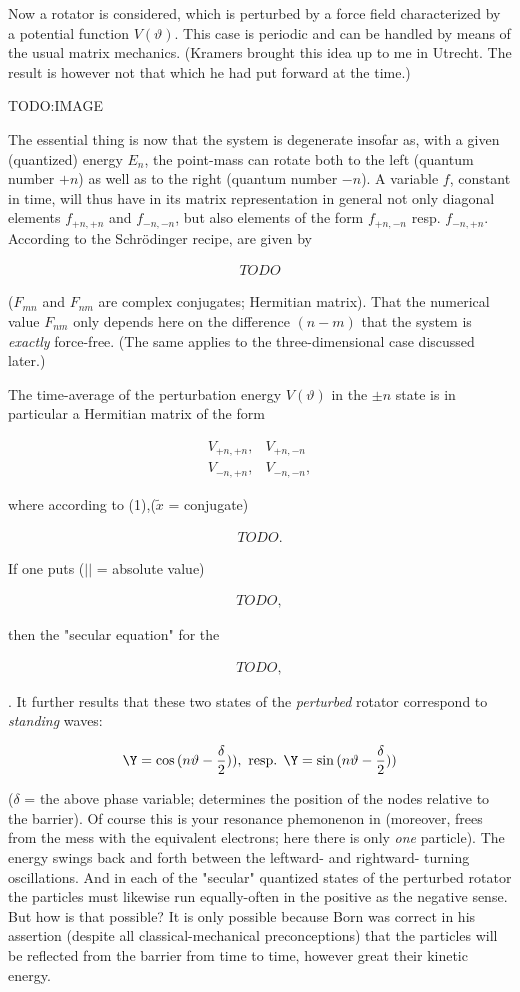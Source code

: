 \documentclass{article}
\newcommand{\nequ}[2]{
\begin{align*}
#1
\tag{#2}
\end{align*}
}
\newcommand{\uequ}[1]{
\begin{align*}
#1
\end{align*}
}
\begin{document}
Now a rotator is considered, which is perturbed  by a force field characterized by a potential function $V(\vartheta)$. This case is periodic and can be handled by means of the usual matrix mechanics.  (Kramers brought this idea up to me in Utrecht. The result is however not that which he had put forward at the time.)


TODO:IMAGE

The essential thing is now that the system is degenerate insofar as, with a given (quantized) energy $E_n$, the point-mass can rotate both to the left (quantum number $+n$) as well as to the right (quantum number $-n$). A variable $f$, constant in time, will thus have in its matrix representation in general not only diagonal elements $f_{+n,+n}$ and $f_{-n,-n}$, but also elements of the form $f_{+n,-n}$ resp. $f_{-n,+n}$. According to the Schr\"odinger recipe,  are given by
\nequ{
TODO
}{1}
($F_{mn}$ and $F_{nm}$ are complex conjugates; Hermitian matrix). That the numerical value $F_{nm}$ only depends here on the difference $(n-m)$  that the system is \textit{exactly} force-free. (The same applies to the three-dimensional case discussed later.)

The time-average of the perturbation energy $V(\vartheta)$ in the $\pm n$ state is in particular a Hermitian matrix of the form
\uequ{
V_{+n,+n}, & V_{+n, -n}\\
V_{-n,+n}, & V_{-n, -n},
}
where according to (1),($\widetilde{x}$ = conjugate)
\uequ{
TODO.
}
If one puts ($||$ = absolute value)
\uequ{
TODO,
}
then the "secular equation" for the 
\uequ{
TODO,
}
. It further results that these two states of the \textit{perturbed} rotator correspond to \textit{standing} waves:
\uequ{
\Y = \cos{(n\vartheta - \frac{\delta}{2}))},\text{ resp. }
\Y = \sin{(n\vartheta - \frac{\delta}{2}))}
}
($\delta$ = the above phase variable; determines the position of the nodes relative to the barrier). Of course this is your  resonance phemonenon in  (moreover, frees from the mess with the equivalent electrons; here there is only \textit{one} particle). The energy swings back and forth between the leftward- and rightward- turning oscillations. And in each of the "secular" quantized states of the perturbed rotator the particles must likewise run equally-often in the positive as the negative sense. But how is that possible? It is only possible because Born was correct in his assertion (despite all classical-mechanical preconceptions) that the particles will be reflected from the barrier from time to time, however great their kinetic energy.
\end{document}
